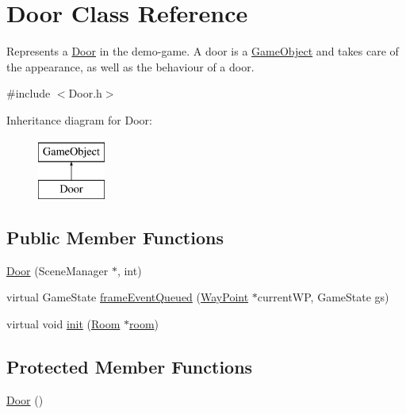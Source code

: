 \hypertarget{classDoor}{\section{\-Door \-Class \-Reference}
\label{classDoor}
}


\-Represents a \hyperlink{classDoor}{\-Door} in the demo-\/game. \-A door is a \hyperlink{classGameObject}{\-Game\-Object} and takes care of the appearance, as well as the behaviour of a door.  




{\ttfamily \#include $<$\-Door.\-h$>$}

\-Inheritance diagram for \-Door\-:\begin{figure}[H]
\begin{center}
\leavevmode
\includegraphics[height=2.000000cm]{classDoor}
\end{center}
\end{figure}
\subsection*{\-Public \-Member \-Functions}
\begin{DoxyCompactItemize}
\item 
\hyperlink{classDoor_a658ddc4507a266a241ad8caa3288c922}{\-Door} (\-Scene\-Manager $\ast$, int)
\item 
virtual \-Game\-State \hyperlink{classDoor_a2e526ecea542d817e04771ed5487bebc}{frame\-Event\-Queued} (\hyperlink{classWayPoint}{\-Way\-Point} $\ast$current\-W\-P, \-Game\-State gs)
\item 
virtual void \hyperlink{classDoor_a6d9a56dd103f3f26b4beaf5682c22187}{init} (\hyperlink{classRoom}{\-Room} $\ast$\hyperlink{classGameObject_a9f63419cc03f2513f757a317a2e37557}{room})
\end{DoxyCompactItemize}
\subsection*{\-Protected \-Member \-Functions}
\begin{DoxyCompactItemize}
\item 
\hyperlink{classDoor_a5191a649ed79b50f886e5c43b473c369}{\-Door} ()
\end{DoxyCompactItemize}
